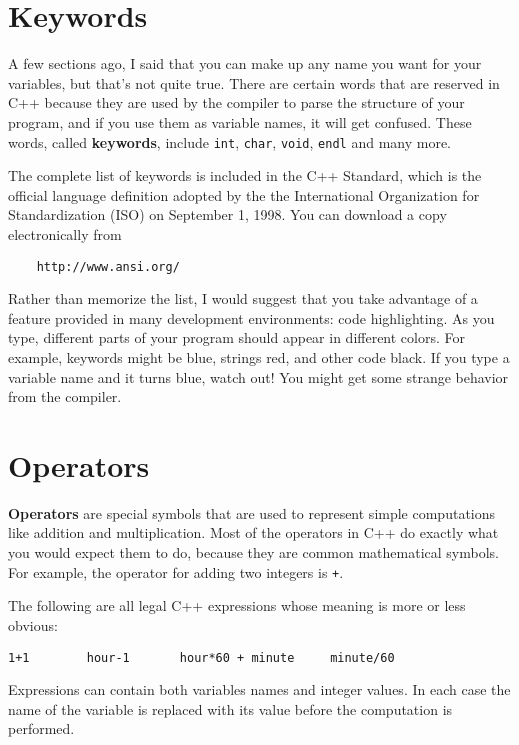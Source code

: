 \section{Keywords}

A few sections ago, I said that you can make up any name you
want for your variables, but that's not quite true.  There
are certain words that are reserved in C++ because they are
used by the compiler to parse the structure of your program,
and if you use them as variable names, it will get confused.
These words, called {\bf keywords}, include {\tt int},
{\tt char}, {\tt void}, {\tt endl} and many more.

The complete list of keywords is included in the C++ Standard, which
is the official language definition adopted by the the International
Organization for Standardization (ISO) on September 1, 1998.  You
can download a copy electronically from

\begin{verbatim}
    http://www.ansi.org/
\end{verbatim}
%
Rather than memorize the list, I would suggest that you
take advantage of a feature provided in many development
environments: code highlighting.  As you type, different
parts of your program should appear in different colors.  For
example, keywords might be blue, strings red, and other code
black.  If you type a variable name and it turns blue, watch
out!  You might get some strange behavior from the compiler.

\section{Operators}

{\bf Operators} are special symbols that are used to represent
simple computations like addition and multiplication.  Most
of the operators in C++ do exactly what you would expect them
to do, because they are common mathematical symbols.  For
example, the operator for adding two integers is {\tt +}.

The following are all legal C++ expressions whose meaning is
more or less obvious:

\begin{verbatim}
1+1        hour-1       hour*60 + minute     minute/60
\end{verbatim}
%
Expressions can contain both variables
names and integer values.  In each case the name of the variable is
replaced with its value before the computation is performed.


